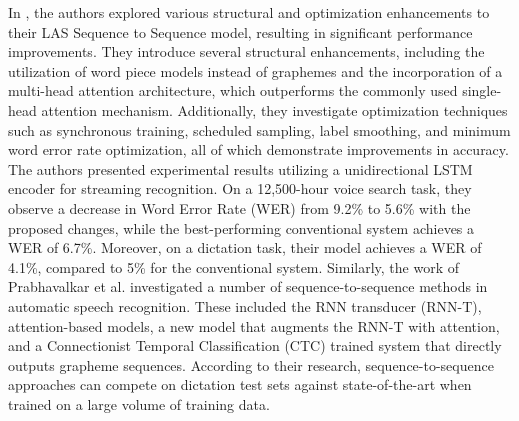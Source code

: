 \documentclass[preprint,12pt]{elsarticle}
\begin{document}
In \citep{chiugoogle}, the authors explored various structural and optimization enhancements to their LAS Sequence to Sequence model, resulting in significant performance improvements. They introduce several structural enhancements, including the utilization of word piece models instead of graphemes and the incorporation of a multi-head attention architecture, which outperforms the commonly used single-head attention mechanism. Additionally, they investigate optimization techniques such as synchronous training, scheduled sampling, label smoothing, and minimum word error rate optimization, all of which demonstrate improvements in accuracy. The authors presented experimental results utilizing a unidirectional LSTM encoder for streaming recognition. On a 12,500-hour voice search task, they observe a decrease in Word Error Rate (WER) from 9.2\% to 5.6\% with the proposed changes, while the best-performing conventional system achieves a WER of 6.7\%. Moreover, on a dictation task, their model achieves a WER of 4.1\%, compared to 5\% for the conventional system. Similarly, the work of Prabhavalkar et al. \citep{prabhavalkar2017comparison} investigated a number of sequence-to-sequence methods in automatic speech recognition. These included the RNN transducer (RNN-T), attention-based models, a new model that augments the RNN-T with attention, and a Connectionist Temporal Classification (CTC) trained system that directly outputs grapheme sequences. According to their research, sequence-to-sequence approaches can compete on dictation test sets against state-of-the-art when trained on a large volume of training data. 
\end{document}
